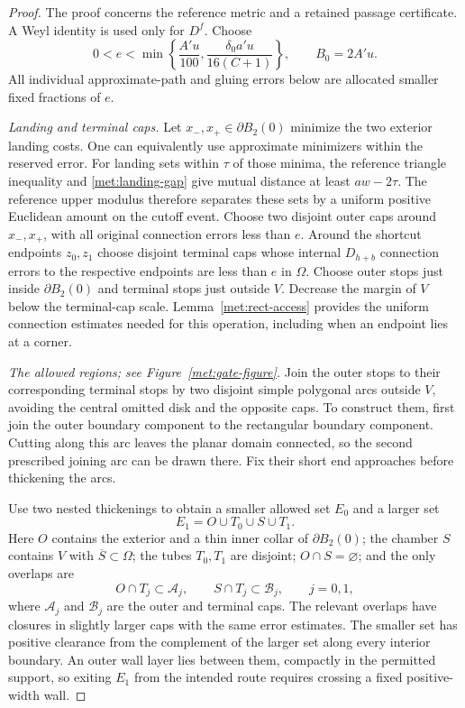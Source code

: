 \documentclass[11pt]{article}
\numberwithin{equation}{section}
\theoremstyle{definition}
\theoremstyle{remark}
\newcommand{\1}{\mathbf 1}
\begin{document}
\begin{proof}
The proof concerns the reference metric and a retained passage
certificate.  A Weyl identity is used only for $D^f$.
Choose
\[
 0<e<\min\left\{\frac{A'u}{100},
                    \frac{\delta_0a'u}{16(C+1)}\right\},
 \qquad B_0=2A'u.
\]
All individual approximate-path and gluing errors below are allocated
smaller fixed fractions of $e$.

\emph{Landing and terminal caps.}
Let $x_-,x_+\in\partial B_2(0)$ minimize the two exterior landing
costs.  One can equivalently use approximate minimizers within the
reserved error.  For landing sets within $\tau$ of those minima,
the reference triangle inequality and
\eqref{met:landing-gap} give mutual distance at least $aw-2\tau$.
The reference upper modulus therefore separates these sets by a
uniform positive Euclidean amount on the cutoff event.
Choose two disjoint outer caps around $x_-,x_+$, with all original
connection errors less than $e$.  Around the shortcut endpoints
$z_0,z_1$ choose disjoint terminal caps whose internal $D_{h+b}$
connection errors to the respective endpoints are less than $e$ in
$\Omega$.  Choose outer stops just inside $\partial B_2(0)$ and
terminal stops just outside $V$.  Decrease the margin of $V$ below the
terminal-cap scale.  Lemma~\ref{met:rect-access} provides the uniform
connection estimates needed for this operation, including when an
endpoint lies at a corner.

\emph{The allowed regions; see Figure~\ref{met:gate-figure}.}
Join the outer stops to their corresponding terminal stops by two
disjoint simple polygonal arcs outside $V$, avoiding the central
omitted disk and the opposite caps.  To construct them, first join
the outer boundary component to the rectangular boundary component.
Cutting along this arc leaves the planar domain connected, so the
second prescribed joining arc can be drawn there.  Fix their short
end approaches before thickening the arcs.

Use two nested thickenings to obtain a smaller allowed set $E_0$ and
a larger set
\[
 E_1=O\cup T_0\cup S\cup T_1.
\]
Here $O$ contains the exterior and a thin inner collar of
$\partial B_2(0)$; the chamber $S$ contains $V$ with
$\overline S\subset\Omega$; the tubes $T_0,T_1$ are disjoint;
$O\cap S=\varnothing$; and the only overlaps are
\[
 O\cap T_j\subset\mathcal A_j,
 \qquad S\cap T_j\subset\mathcal B_j,
 \qquad j=0,1,
\]
where $\mathcal A_j$ and $\mathcal B_j$ are the outer and terminal
caps.  The relevant overlaps have closures in slightly larger caps
with the same error estimates.  The smaller set has positive
clearance from the complement of the larger set along every interior
boundary.  An outer wall layer lies between them, compactly in the
permitted support, so exiting $E_1$ from the intended route requires
crossing a fixed positive-width wall.


\end{proof}
\end{document}
